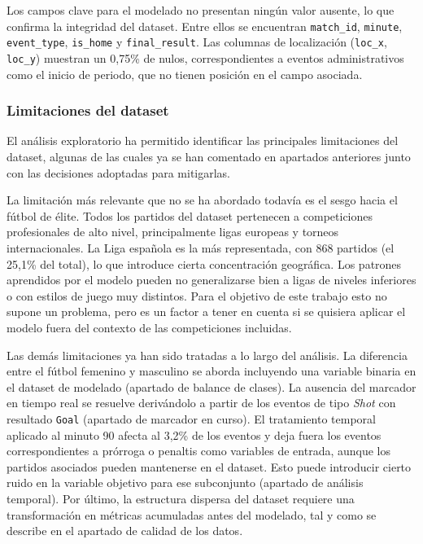 Los campos clave para el modelado no presentan ningún valor ausente, lo que confirma la integridad del dataset. Entre ellos se encuentran \texttt{match\_id}, \texttt{minute}, \texttt{event\_type}, \texttt{is\_home} y \texttt{final\_result}. Las columnas de localización (\texttt{loc\_x}, \texttt{loc\_y}) muestran un 0,75\% de nulos, correspondientes a eventos administrativos como el inicio de periodo, que no tienen posición en el campo asociada.

\subsubsection{Limitaciones del dataset}

El análisis exploratorio ha permitido identificar las principales limitaciones del dataset, algunas de las cuales ya se han comentado en apartados anteriores junto con las decisiones adoptadas para mitigarlas.

La limitación más relevante que no se ha abordado todavía es el sesgo hacia el fútbol de élite. Todos los partidos del dataset pertenecen a competiciones profesionales de alto nivel, principalmente ligas europeas y torneos internacionales. La Liga española es la más representada, con 868 partidos (el 25,1\% del total), lo que introduce cierta concentración geográfica. Los patrones aprendidos por el modelo pueden no generalizarse bien a ligas de niveles inferiores o con estilos de juego muy distintos. Para el objetivo de este trabajo esto no supone un problema, pero es un factor a tener en cuenta si se quisiera aplicar el modelo fuera del contexto de las competiciones incluidas.

Las demás limitaciones ya han sido tratadas a lo largo del análisis. La diferencia entre el fútbol femenino y masculino se aborda incluyendo una variable binaria en el dataset de modelado (apartado de balance de clases). La ausencia del marcador en tiempo real se resuelve derivándolo a partir de los eventos de tipo \textit{Shot} con resultado \texttt{Goal} (apartado de marcador en curso). El tratamiento temporal aplicado al minuto 90 afecta al 3,2\% de los eventos y deja fuera los eventos correspondientes a prórroga o penaltis como variables de entrada, aunque los partidos asociados pueden mantenerse en el dataset. Esto puede introducir cierto ruido en la variable objetivo para ese subconjunto (apartado de análisis temporal). Por último, la estructura dispersa del dataset requiere una transformación en métricas acumuladas antes del modelado, tal y como se describe en el apartado de calidad de los datos.

